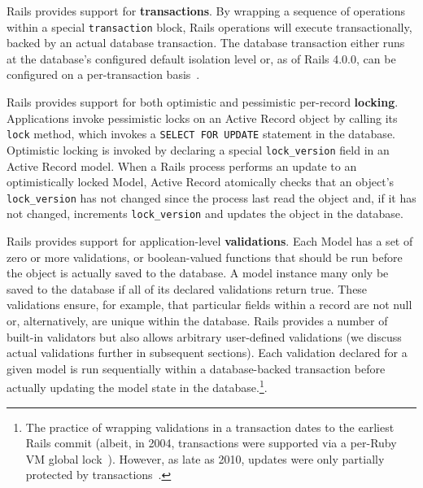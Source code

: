 \begin{myenumerate}
\item Rails provides support for \textbf{transactions}. By wrapping a
sequence of operations within a special \texttt{transaction} block,
Rails operations will execute transactionally, backed by an actual
database transaction. The database transaction either runs at the
database's configured default isolation level or, as of Rails 4.0.0, can
be configured on a per-transaction
basis~\cite{code-transaction-isolation}.

\item Rails provides support for both optimistic and pessimistic
  per-record \textbf{locking}. Applications invoke pessimistic locks
  on an Active Record object by calling its \texttt{lock} method,
  which invokes a \texttt{SELECT FOR UPDATE} statement in the
  database. Optimistic locking is invoked by declaring a special
  \texttt{lock\_version} field in an Active Record model. When a Rails
  process performs an update to an optimistically locked Model, Active
  Record atomically checks that an object's \texttt{lock\_version} has
  not changed since the process last read the object and, if it has
  not changed, increments \texttt{lock\_version} and updates the
  object in the database.

\item Rails provides support for application-level
  \textbf{validations}. Each Model has a set of zero or more
  validations, or boolean-valued functions that should be run before
  the object is actually saved to the database. A model instance many
  only be saved to the database if all of its declared validations
  return true. These validations ensure, for example, that particular
  fields within a record are not null or, alternatively, are unique
  within the database. Rails provides a number of built-in validators
  but also allows arbitrary user-defined validations (we discuss
  actual validations further in subsequent sections). Each validation
  declared for a given model is run sequentially within a
  database-backed transaction before actually updating the model state
  in the database.\footnote{The practice
    of wrapping validations in a transaction dates to the earliest
    Rails commit (albeit, in 2004, transactions were supported via a
    per-Ruby VM global lock~\cite{code-txn-lock}). However,
    as late as 2010, updates were only partially protected by
    transactions~\cite{code-txn-update}.}.\\[-2mm]


\end{myenumerate}
